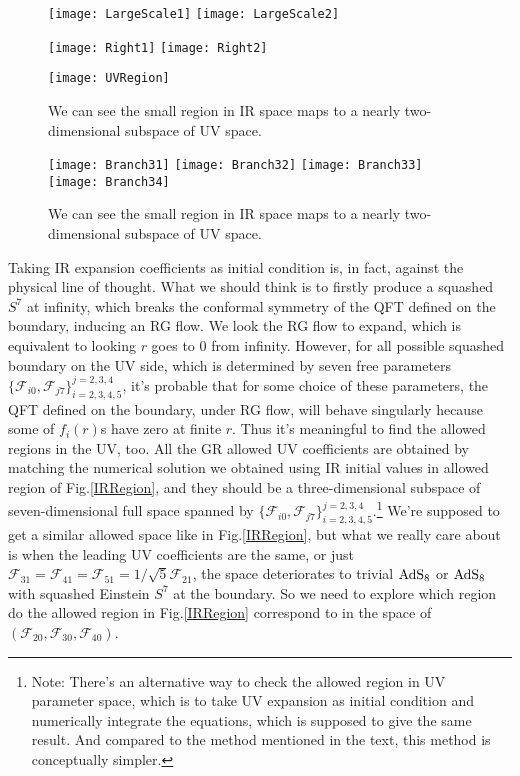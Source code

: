 \documentclass[12pt, a4paper]{article}
\numberwithin{equation}{section}
\newcommand{\cF}{\mathcal{F}}
\begin{document}
\begin{figure}[t]
	\texttt{[image: LargeScale1]}
	\texttt{[image: LargeScale2]}
	
	\texttt{[image: Right1]}
	\texttt{[image: Right2]}
	
	\texttt{[image: UVRegion]}
	\caption{{\rm We can see the small region in IR space maps to a nearly two-dimensional subspace of UV space.}}
	\label{UV}
\end{figure}

\begin{figure}[t]	
	\texttt{[image: Branch31]}
	\texttt{[image: Branch32]}
	\texttt{[image: Branch33]}
	\texttt{[image: Branch34]}
	\caption{{\rm We can see the small region in IR space maps to a nearly two-dimensional subspace of UV space.}}
	\label{Origin}
\end{figure}

Taking IR expansion coefficients as initial condition is, in fact, against the physical line of thought. What we should think is to firstly produce a squashed $S^7$ at infinity, which breaks the conformal symmetry of the QFT defined on the boundary, inducing an RG flow. We look the RG flow to expand, which is equivalent to looking $r$ goes to $0$ from infinity. However, for all possible squashed boundary on the UV side, which is determined by seven free parameters $\{\cF_{i0}, \cF_{j7}\}_{i = 2,3,4,5}^{j = 2,3,4}$, it's probable that for some choice of these parameters, the QFT defined on the boundary, under RG flow, will behave singularly hecause some of $f_i(r)$s have zero at finite $r$. Thus it's meaningful to find the allowed regions in the UV, too. All the GR allowed UV coefficients are obtained by matching the numerical solution we obtained using IR initial values in allowed region of Fig.\ref{IRRegion}, and they should be a three-dimensional subspace of seven-dimensional full space spanned by $\{\cF_{i0}, \cF_{j7}\}_{i = 2,3,4,5}^{j = 2,3,4}$.\footnote{Note: There's an alternative way to check the allowed region in UV parameter space, which is to take UV expansion as initial condition and numerically integrate the equations, which is supposed to give the same result. And compared to the method mentioned in the text, this method is conceptually simpler.} We're supposed to get a similar allowed space like in Fig.\ref{IRRegion}, but what we really care about is when the leading UV coefficients are the same, or just $\cF_{31} = \cF_{41} = \cF_{51} = 1/\sqrt{5} \cF_{21}$, the space deteriorates to trivial ${\rm AdS_8}$ or ${\rm AdS_8}$ with squashed Einstein $S^7$ at the boundary. So we need to explore which region do the allowed region in Fig.\ref{IRRegion} correspond to in the space of $(\cF_{20},\cF_{30},\cF_{40})$. 
\end{document}
